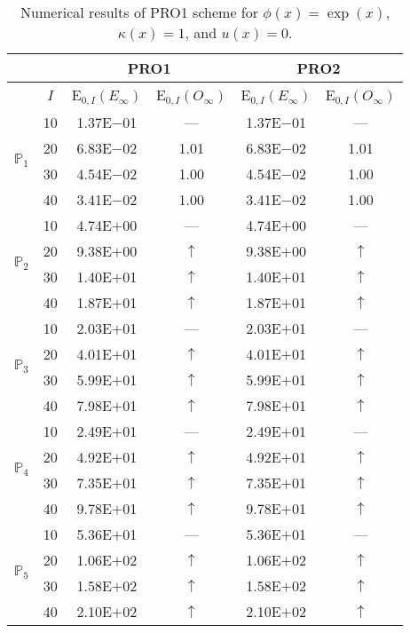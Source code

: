 \begin{table}[H]
\caption{Numerical results of PRO1 scheme for $\phi(x)=\exp(x)$, $\kappa(x)=1$, and $u(x)=0$.}
\setlength{\tabcolsep}{5pt}
\centering
\begin{tabular}{@{}l c c c c c@{}}
\toprule
 &  & \multicolumn{2}{c}{PRO1} & \multicolumn{2}{c}{PRO2}\\
\midrule
 & $I$ & E$_{0,I}(E_{\infty})$ & E$_{0,I}(O_{\infty})$ & E$_{0,I}(E_{\infty})$ & E$_{0,I}(O_{\infty})$\\
\midrule
\multirow{4}{*}{$\mathbb{P}_{1}$}
 & 10 & 1.37E$-$01 & --- & 1.37E$-$01 & ---\\
 & 20 & 6.83E$-$02 & 1.01 & 6.83E$-$02 & 1.01 \\
 & 30 & 4.54E$-$02 & 1.00 & 4.54E$-$02 & 1.00 \\
 & 40 & 3.41E$-$02 & 1.00 & 3.41E$-$02 & 1.00 \\
\midrule
\multirow{4}{*}{$\mathbb{P}_{2}$}
 & 10 & 4.74E$+$00 & --- & 4.74E$+$00 & ---\\
 & 20 & 9.38E$+$00 & $\uparrow$ & 9.38E$+$00 & $\uparrow$ \\
 & 30 & 1.40E$+$01 & $\uparrow$ & 1.40E$+$01 & $\uparrow$ \\
 & 40 & 1.87E$+$01 & $\uparrow$ & 1.87E$+$01 & $\uparrow$ \\
\midrule
\multirow{4}{*}{$\mathbb{P}_{3}$}
 & 10 & 2.03E$+$01 & --- & 2.03E$+$01 & ---\\
 & 20 & 4.01E$+$01 & $\uparrow$ & 4.01E$+$01 & $\uparrow$ \\
 & 30 & 5.99E$+$01 & $\uparrow$ & 5.99E$+$01 & $\uparrow$ \\
 & 40 & 7.98E$+$01 & $\uparrow$ & 7.98E$+$01 & $\uparrow$ \\
\midrule
\multirow{4}{*}{$\mathbb{P}_{4}$}
 & 10 & 2.49E$+$01 & --- & 2.49E$+$01 & ---\\
 & 20 & 4.92E$+$01 & $\uparrow$ & 4.92E$+$01 & $\uparrow$ \\
 & 30 & 7.35E$+$01 & $\uparrow$ & 7.35E$+$01 & $\uparrow$ \\
 & 40 & 9.78E$+$01 & $\uparrow$ & 9.78E$+$01 & $\uparrow$ \\
\midrule
\multirow{4}{*}{$\mathbb{P}_{5}$}
 & 10 & 5.36E$+$01 & --- & 5.36E$+$01 & ---\\
 & 20 & 1.06E$+$02 & $\uparrow$ & 1.06E$+$02 & $\uparrow$ \\
 & 30 & 1.58E$+$02 & $\uparrow$ & 1.58E$+$02 & $\uparrow$ \\
 & 40 & 2.10E$+$02 & $\uparrow$ & 2.10E$+$02 & $\uparrow$ \\
\bottomrule
\end{tabular}
\label{Table:PRO:Test1}
\end{table}
